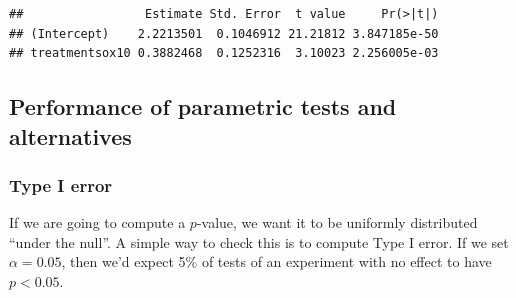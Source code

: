 \documentclass[]{book}
\begin{document}
\begin{verbatim}
##                 Estimate Std. Error  t value     Pr(>|t|)
## (Intercept)    2.2213501  0.1046912 21.21812 3.847185e-50
## treatmentsox10 0.3882468  0.1252316  3.10023 2.256005e-03
\end{verbatim}

\subsection{Performance of parametric tests and
alternatives}\label{performance-of-parametric-tests-and-alternatives}

\subsubsection{Type I error}\label{type-i-error}

If we are going to compute a \(p\)-value, we want it to be uniformly
distributed ``under the null''. A simple way to check this is to compute
Type I error. If we set \(\alpha = 0.05\), then we'd expect 5\% of tests
of an experiment with no effect to have \(p < 0.05\).
\end{document}
